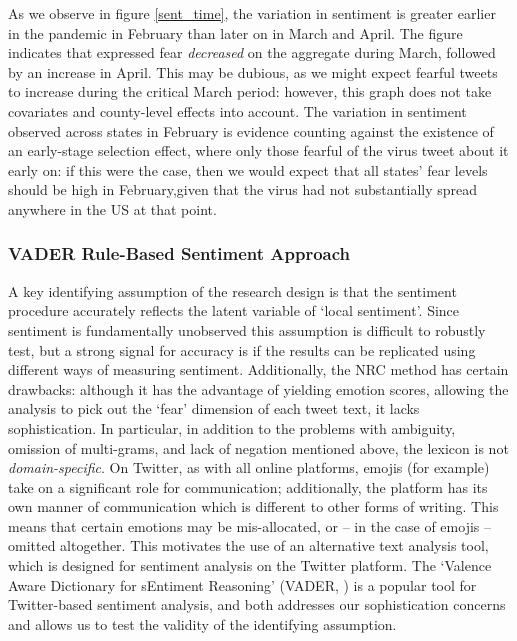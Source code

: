 \documentclass{article}
\begin{document}
As we observe in figure \ref{sent_time}, the variation in sentiment is greater earlier in the pandemic in February than later on in March and April.  The figure indicates that expressed fear \textit{decreased} on the aggregate during March, followed by an increase in April. This may be dubious, as we might expect fearful tweets to increase during the critical March period: however, this graph does not take covariates and county-level effects into account. The variation in sentiment observed across states in February is evidence counting against the existence of an early-stage selection effect, where only those fearful of the virus tweet about it early on: if this were the case, then we would expect that all states' fear levels should be high in February,given that the virus had not substantially spread anywhere in the US at that point.

\subsubsection{VADER Rule-Based Sentiment Approach}\label{vader}
A key identifying assumption of the research design is that the sentiment procedure accurately reflects the latent variable of `local sentiment'. Since sentiment is fundamentally unobserved this assumption is difficult to robustly test, but a strong signal for accuracy is if the results can be replicated using different ways of measuring sentiment. Additionally, the NRC method has certain drawbacks: although it has the advantage of yielding emotion scores, allowing the analysis to pick out the `fear' dimension of each tweet text, it lacks sophistication. In particular, in addition to the problems with ambiguity, omission of multi-grams, and lack of negation mentioned above, the lexicon is not \textit{domain-specific}. On Twitter, as with all online platforms, emojis (for example) take on a significant role for communication; additionally, the platform has its own manner of communication which is different to other forms of writing. This means that certain emotions may be mis-allocated, or -- in the case of emojis -- omitted altogether. This motivates the use of an alternative text analysis tool, which is designed for sentiment analysis on the Twitter platform. The `Valence Aware Dictionary for sEntiment Reasoning' (VADER, \textcite{huttoVaderParsimoniousRulebased2014}) is a popular tool for Twitter-based sentiment analysis, and both addresses our sophistication concerns and allows us to test the validity of the identifying assumption.
\end{document}
